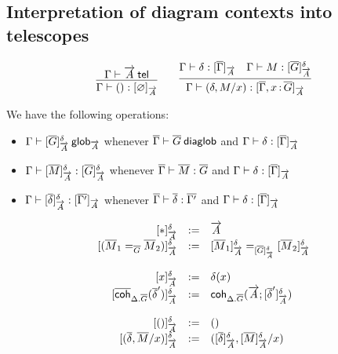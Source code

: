 \subsection{Interpretation of diagram contexts into telescopes}

\begin{small}
\[\infer
    {\ofinterp{\Gamma}{()}{\emptyctx}{\tel A}}
    {\wftel{\Gamma}{\tel A}}
  \qquad
  \infer
    {\ofinterp{\Gamma}{(\delta,M/x)}{\diag\Gamma,\tptm{x}{\diag G}}{\tel A}}
    {\ofinterp{\Gamma}{\delta}{\diag\Gamma}{\tel A}
    &\ofglob{\Gamma}{M}{\interpglob{\diag G}{\tel A}{\delta}}}
\]
\end{small}

We have the following operations:
\begin{itemize}
\item ${\Gamma} \vdash {[{\ensuremath{\overline{G}}}]_{\ensuremath{\overrightarrow{A}}}^{\delta}} \: \mathsf{glob}_{\overrightarrow{A}}$ whenever
  ${\overline{\Gamma}} \vdash {\ensuremath{\overline{G}}} \: \mathsf{diaglob}$ and ${\Gamma} \vdash {\delta} : {[ \overline{\Gamma} ]_{\overrightarrow{A}}}$
\item ${\Gamma} \vdash {[{\ensuremath{\overline{M}}}]_{\ensuremath{\overrightarrow{A}}}^{\delta}} : {} {[{\overline{G}}]_{\overrightarrow{A}}^{\delta}}$ whenever ${\overline{\Gamma}} \vdash {\ensuremath{\overline{M}}} : {\overline{G}}$ and
  ${\Gamma} \vdash {\delta} : {[ \overline{\Gamma} ]_{\overrightarrow{A}}}$
\item ${\Gamma} \vdash {[{\ensuremath{\overline{\delta}}}]_{\ensuremath{\overrightarrow{A}}}^{\delta}} : {[ \overline{\Gamma'} ]_{\overrightarrow{A}}}$
  whenever ${\overline{\Gamma}} \vdash {\ensuremath{\overline{\delta}}} : {\overline{\Gamma'}}$ and
  ${\Gamma} \vdash {\delta} : {[ \overline{\Gamma} ]_{\overrightarrow{A}}}$
\end{itemize}

\begin{small}
  \[
  \begin{array}{rcl}
    \interpglob{\diagbase}{\tel A}{\delta} & := & \tel A \\
    \interpglob{(\homj{\diag G}{\diag M_1}{\diag M_2})}{\tel A}{\delta} & := &
    \homj{\interpglob{\diag G}{\tel A}{\delta}}
         {\interpglob{\diag M_1}{\tel A}{\delta}}
    {\interpglob{\diag M_2}{\tel A}{\delta}}\\\\

    \interpglob{x}{\tel A}{\delta} & := & \delta(x) \\
    \interpglob{\diagcoh{\Delta.\diag{G}}{\diag \delta'}}{\tel A}{\delta} & := &
    \coh{\Delta.\diag G}{\tel A}{\interpglob{\diag\delta'}{\tel A}{\delta}}\\\\

    \interpglob{()}{\tel A}{\delta} & := & () \\
    \interpglob{(\diag \delta,\diag M/x)}{\tel A}{\delta} & := &
    (\interpglob{\diag\delta}{\tel A}{\delta},\interpglob{\diag
    M}{\tel A}{\delta}/x)
  \end{array}
  \]
\end{small}

